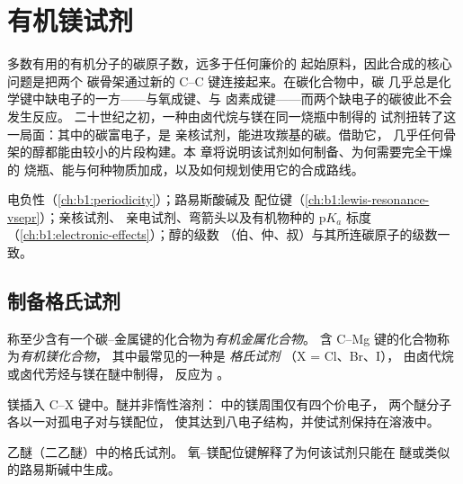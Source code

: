 \chapter{有机镁试剂}\label{ch:b1:organomagnesium}

多数有用的有机分子的碳原子数，远多于任何廉价的
起始原料，因此合成的核心问题是把两个
碳骨架通过新的 C--C 键连接起来。在碳化合物中，碳
几乎总是化学键中缺电子的一方——与氧成键、与
卤素成键——而两个缺电子的碳彼此不会发生反应。
二十世纪之初，一种由卤代烷与镁在同一烧瓶中制得的
试剂扭转了这一局面：其中的碳富电子，是
亲核试剂，能进攻羰基的碳。借助它，
几乎任何骨架的醇都能由较小的片段构建。本
章将说明该试剂如何制备、为何需要完全干燥的
烧瓶、能与何种物质加成，以及如何规划使用它的合成路线。

\begin{recall}
电负性（\cref{ch:b1:periodicity}）；路易斯酸碱及
配位键（\cref{ch:b1:lewis-resonance-vsepr}）；亲核试剂、
亲电试剂、弯箭头以及有机物种的 $\mathrm{p}K_a$ 标度
（\cref{ch:b1:electronic-effects}）；醇的级数
（伯、仲、叔）与其所连碳原子的级数一致。
\end{recall}

\section{制备格氏试剂}

\begin{definition}\label{def:b1:organomagnesium:organometallic}
称至少含有一个碳–金属键的化合物为\emph{有机金属化合物}。
含 C--Mg 键的化合物称为\emph{有机镁化合物}，
其中最常见的一种是
\emph{格氏试剂} （X = Cl、Br、I），
由卤代烷或卤代芳烃与镁在醚中制得，
反应为 。
\end{definition}

镁插入 C--X 键中。醚并非惰性溶剂：
 中的镁周围仅有四个价电子，
两个醚分子各以一对孤电子对与镁配位，
使其达到八电子结构，并使试剂保持在溶液中。

\begin{omfigure}

{\small 乙醚（二乙醚）中的格氏试剂。
氧–镁配位键解释了为何该试剂只能在
醚或类似的路易斯碱中生成。}
\end{omfigure}

